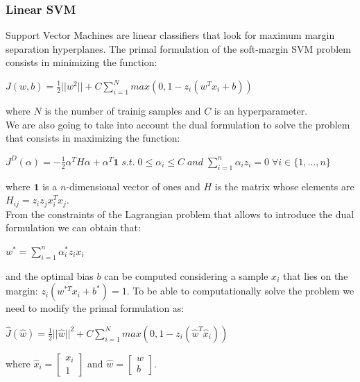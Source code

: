 \documentclass[10pt, a4paper, twocolumn]{article} %
\begin{document}
\subsubsection{Linear SVM}
Support Vector Machines are linear classifiers that look for maximum margin separation hyperplanes.
The primal formulation of the soft-margin SVM problem consists in minimizing the function:
\begin{center}
	\begin{math}
		J(w,b)=\frac{1}{2}||w^2|| + C\sum_{i=1}^{N}max(0, 1-z_i(w^Tx_i+b))
	\end{math}
\end{center}
where $N$ is the number of trainig samples and $C$ is an hyperparameter.\\
We are also going to take into account the dual formulation to solve the problem that consists in maximizing the function:
\begin{center}
	\begin{math}
		J^D(\alpha)=-\frac{1}{2}\alpha^TH\alpha + \alpha^T\textbf{1} \; s.t.\; 0 \le \alpha_i \le C \;and\;\sum_{i=1}^{n}\alpha_iz_i=0 \; \forall i\in \{1,...,n\}
	\end{math}
\end{center}
where $\textbf{1}$ is a $n$-dimensional vector of ones and $H$ is the matrix
whose elements are $H_{ij} = z_iz_jx_i^Tx_j$.\\
From the constraints of the Lagrangian problem that allows to introduce the dual formulation
we can obtain that:
\begin{center}
	$w^*=\sum_{i=1}^{n}\alpha_i^*z_ix_i$
\end{center}
and the optimal bias $b$ can be computed considering a sample $x_i$ that lies on the margin: $z_i(w^{*T}x_i+b^*)=1$.
To be able to computationally solve the problem
we need to modify the primal formulation as:
\begin{center}
	\begin{math}
		\hat{J}(\hat{w})=\frac{1}{2}||\hat{w}||^2 + C\sum_{i=1}^{N}max(0, 1-z_i(\hat{w}^T\hat{x}_i))
	\end{math}
\end{center}
where $\hat{x}_i = \begin{bmatrix} x_i\\ 1 \end{bmatrix}$ and $\hat{w} = \begin{bmatrix} w\\ b \end{bmatrix}$.\\
\end{document}
